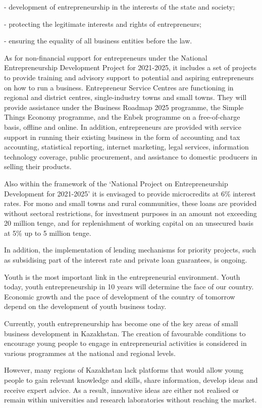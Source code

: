 \begin{multicols}{2}
- development of entrepreneurship in the interests of the state and
society;

- protecting the legitimate interests and rights of entrepreneurs;

- ensuring the equality of all business entities before the law.

As for non-financial support for entrepreneurs under the National
Entrepreneurship Development Project for 2021-2025, it includes a set of
projects to provide training and advisory support to potential and
aspiring entrepreneurs on how to run a business. Entrepreneur Service
Centres are functioning in regional and district centres,
single-industry towns and small towns. They will provide assistance
under the Business Roadmap 2025 programme, the Simple Things Economy
programme, and the Enbek programme on a free-of-charge basis, offline
and online. In addition, entrepreneurs are provided with service support
in running their existing business in the form of accounting and tax
accounting, statistical reporting, internet marketing, legal services,
information technology coverage, public procurement, and assistance to
domestic producers in selling their products.

Also within the framework of the `National Project on Entrepreneurship
Development for 2021-2025' it is envisaged to provide microcredits at
6\% interest rates. For mono and small towns and rural communities,
these loans are provided without sectoral restrictions, for investment
purposes in an amount not exceeding 20 million tenge, and for
replenishment of working capital on an unsecured basis at 5\% up to 5
million tenge.

In addition, the implementation of lending mechanisms for priority
projects, such as subsidising part of the interest rate and private loan
guarantees, is ongoing.

Youth is the most important link in the entrepreneurial environment.
Youth today, youth entrepreneurship in 10 years will determine the face
of our country. Economic growth and the pace of development of the
country of tomorrow depend on the development of youth business today.

Currently, youth entrepreneurship has become one of the key areas of
small business development in Kazakhstan. The creation of favourable
conditions to encourage young people to engage in entrepreneurial
activities is considered in various programmes at the national and
regional levels.

However, many regions of Kazakhstan lack platforms that would allow
young people to gain relevant knowledge and skills, share information,
develop ideas and receive expert advice. As a result, innovative ideas
are either not realised or remain within universities and research
laboratories without reaching the market.


\end{multicols}
